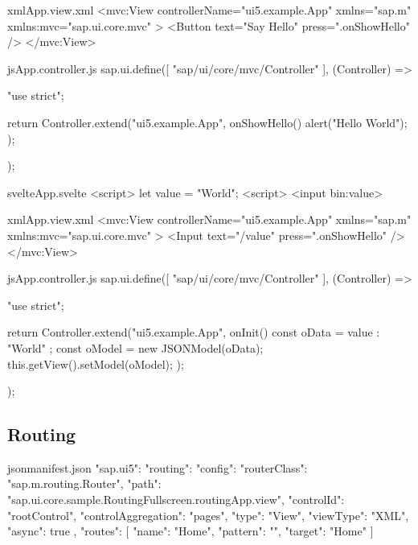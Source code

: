 \begin{myminted}{xml}{App.view.xml}
<mvc:View
    controllerName="ui5.example.App"
    xmlns="sap.m"
    xmlns:mvc="sap.ui.core.mvc"
>
<Button
    text="Say Hello"
    press=".onShowHello"
/>
</mvc:View>
\end{myminted}
\begin{myminted}{js}{App.controller.js}
sap.ui.define([
    "sap/ui/core/mvc/Controller"
], (Controller) => {
    "use strict";

    return Controller.extend("ui5.example.App", {
        onShowHello() {
            alert("Hello World");
        }
    });
});
\end{myminted}



\begin{myminted}{svelte}{App.svelte}
<script>
    let value = "World";
<script>
<input bin:value> 
\end{myminted}
\begin{myminted}{xml}{App.view.xml}
<mvc:View
    controllerName="ui5.example.App"
    xmlns="sap.m"
    xmlns:mvc="sap.ui.core.mvc"
>
<Input
    text="{/value}"
    press=".onShowHello"
/>
</mvc:View>
\end{myminted}
\begin{myminted}{js}{App.controller.js}
sap.ui.define([
  "sap/ui/core/mvc/Controller"
], (Controller) => {
  "use strict";

  return Controller.extend("ui5.example.App", {
    onInit() {
      const oData = {
        value : "World"
      };
      const oModel = new JSONModel(oData);
      this.getView().setModel(oModel);
    }
    });
});
\end{myminted}

\subsection{Routing}


\begin{myminted}{json}{manifest.json}
{
  "sap.ui5": {
    "routing": {
      "config": {
        "routerClass": "sap.m.routing.Router",
        "path": "sap.ui.core.sample.RoutingFullscreen.routingApp.view",
        "controlId": "rootControl",
        "controlAggregation": "pages",
        "type": "View",
        "viewType": "XML",
        "async": true
      },
      "routes": [
        {
          "name": "Home",
          "pattern": "",
          "target": "Home"
        }
      ]
    }
  }
}
\end{myminted}

